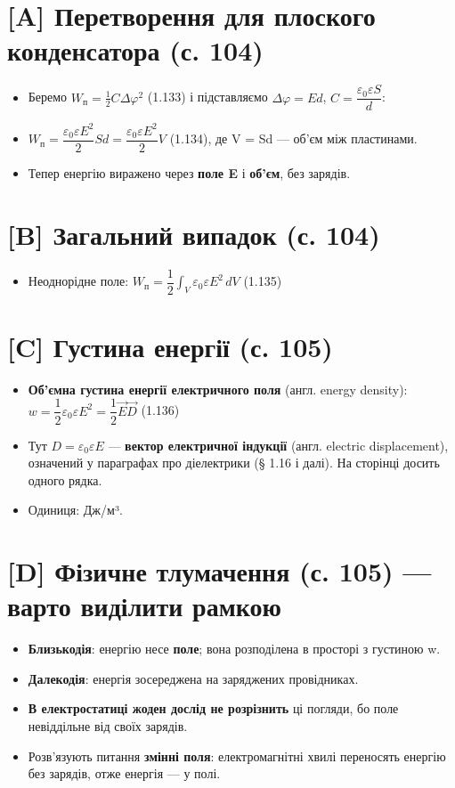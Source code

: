 \documentclass[11pt,a4paper,oneside]{book}
\begin{document}
\section*{[A] Перетворення для плоского конденсатора (с. 104)}
\begin{itemize}
\item Беремо $W_\text{п} = \tfrac12 C\Delta\varphi^2$ (1.133) і підставляємо $\Delta\varphi = Ed$, $C = \dfrac{\varepsilon_0\varepsilon S}{d}$:
\item $W_\text{п} = \dfrac{\varepsilon_0\varepsilon E^2}{2}Sd = \dfrac{\varepsilon_0\varepsilon E^2}{2}V$ (1.134), де V = Sd — об'єм між пластинами.
\item Тепер енергію виражено через \textbf{поле E} і \textbf{об'єм}, без зарядів.
\end{itemize}

\section*{[B] Загальний випадок (с. 104)}
\begin{itemize}
\item Неоднорідне поле: $W_\text{п} = \dfrac12\int_V \varepsilon_0\varepsilon E^2\,dV$ (1.135)
\end{itemize}

\section*{[C] Густина енергії (с. 105)}
\begin{itemize}
\item \textbf{Об'ємна густина енергії електричного поля} (англ. energy density):
$w = \dfrac12\varepsilon_0\varepsilon E^2 = \dfrac12\vec E\vec D$ (1.136)
\item Тут $D = \varepsilon_0\varepsilon E$ — \textbf{вектор електричної індукції} (англ. electric displacement), означений у параграфах про діелектрики (§ 1.16 і далі). На сторінці досить одного рядка.
\item Одиниця: Дж/м³.
\end{itemize}

\section*{[D] Фізичне тлумачення (с. 105) — варто виділити рамкою}
\begin{itemize}
\item \textbf{Близькодія}: енергію несе \textbf{поле}; вона розподілена в просторі з густиною w.
\item \textbf{Далекодія}: енергія зосереджена на заряджених провідниках.
\item \textbf{В електростатиці жоден дослід не розрізнить} ці погляди, бо поле невіддільне від своїх зарядів.
\item Розв'язують питання \textbf{змінні поля}: електромагнітні хвилі переносять енергію без зарядів, отже енергія — у полі.
\end{itemize}
\end{document}
